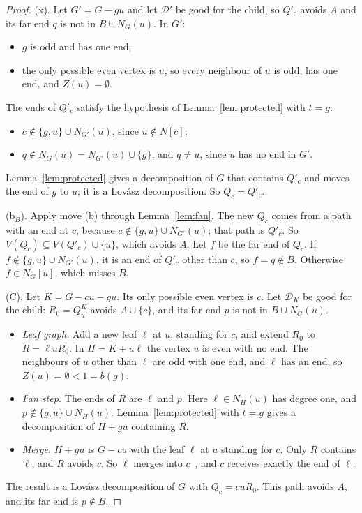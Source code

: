 \documentclass[11pt]{amsart}
\theoremstyle{definition}
\newcommand{\cD}{\mathcal D}
\begin{document}
\begin{proof}
(x). Let $G'=G-gu$ and let $\cD'$ be good for the child, so $Q'_c$ avoids $A$ and its far end $q$
is not in $B\cup N_G(u)$. In $G'$:
\begin{itemize}
\item $g$ is odd and has one end;
\item the only possible even vertex is $u$, so every neighbour of $u$ is odd, has one end, and
$Z(u)=\emptyset$.
\end{itemize}
The ends of $Q'_c$ satisfy the hypothesis of Lemma~\ref{lem:protected} with $t=g$:
\begin{itemize}
\item $c\notin\{g,u\}\cup N_{G'}(u)$, since $u\notin N[c]$;
\item $q\notin N_G(u)=N_{G'}(u)\cup\{g\}$, and $q\ne u$, since $u$ has no end in $G'$.
\end{itemize}
Lemma~\ref{lem:protected} gives a decomposition of $G$ that contains $Q'_c$ and moves the end of $g$
to $u$; it is a Lov\'asz decomposition. So $Q_c=Q'_c$.

(b$_B$). Apply move (b) through Lemma~\ref{lem:fan}. The new $Q_c$ comes from a path with an end at
$c$, because $c\notin\{g,u\}\cup N_{G'}(u)$; that path is $Q'_c$. So $V(Q_c)\subseteq
V(Q'_c)\cup\{u\}$, which avoids $A$. Let $f$ be the far end of $Q_c$. If $f\notin\{g,u\}\cup
N_{G'}(u)$, it is an end of $Q'_c$ other than $c$, so $f=q\notin B$. Otherwise $f\in N_G[u]$, which
misses $B$.

(C). Let $K=G-cu-gu$. Its only possible even vertex is $c$. Let $\cD_K$ be good for the child:
$R_0=Q^K_u$ avoids $A\cup\{c\}$, and its far end $p$ is not in $B\cup N_G(u)$.
\begin{itemize}
\item \emph{Leaf graph.} Add a new leaf $\ell$ at $u$, standing for $c$, and extend $R_0$ to
$R=\ell uR_0$. In $H=K+u\ell$ the vertex $u$ is even with no end. The neighbours of $u$ other than
$\ell$ are odd with one end, and $\ell$ has an end, so $Z(u)=\emptyset<1=b(g)$.
\item \emph{Fan step.} The ends of $R$ are $\ell$ and $p$. Here $\ell\in N_H(u)$ has degree one,
and $p\notin\{g,u\}\cup N_H(u)$. Lemma~\ref{lem:protected} with $t=g$ gives a decomposition of
$H+gu$ containing $R$.
\item \emph{Merge.} $H+gu$ is $G-cu$ with the leaf $\ell$ at $u$ standing for $c$. Only $R$
contains $\ell$, and $R$ avoids $c$. So $\ell$ merges into $c$~\cite[Lemma~12]{MS}, and $c$
receives exactly the end of $\ell$.
\end{itemize}
The result is a Lov\'asz decomposition of $G$ with $Q_c=cuR_0$. This path avoids $A$, and its far
end is $p\notin B$.


\end{proof}
\end{document}
